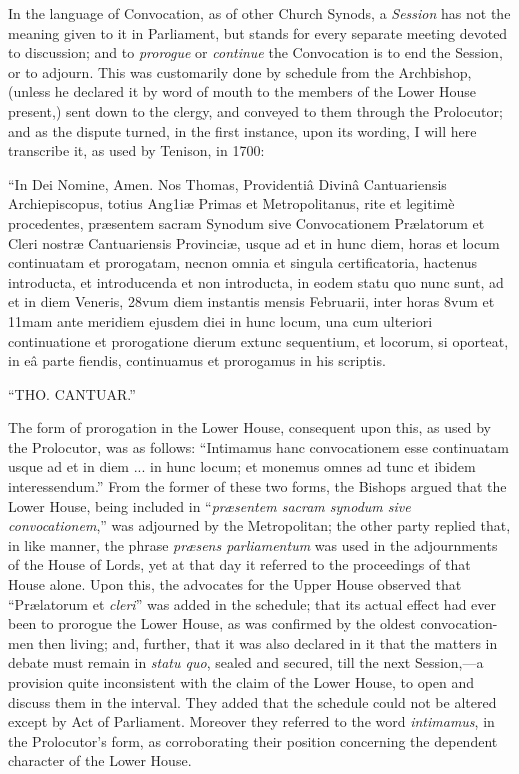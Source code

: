 In the language of
Convocation, as of other Church Synods, a \emph{Session} has not the
meaning given to it in Parliament, but stands for every separate
meeting devoted to discussion; and to \emph{prorogue} or \emph{continue}
the Convocation is to end the Session, or to adjourn. This was
customarily done by schedule from the Archbishop, (unless he declared
it by word of mouth to the members of the Lower House present,) sent
down to the clergy, and conveyed to them through the Prolocutor; and
as the dispute turned, in the first instance, upon its wording, I will
here transcribe it, as used by Tenison, in 1700:

``In Dei Nomine, Amen. Nos Thomas, Providentiâ Divinâ
Cantuariensis Archiepiscopus, totius Ang1iæ Primas et Metropolitanus,
rite et legitimè procedentes, præsentem sacram Synodum sive
Convocationem Prælatorum et Cleri nostræ Cantuariensis Provinciæ,
usque ad et in hunc diem, horas et locum continuatam et prorogatam,
necnon omnia et singula certificatoria, hactenus introducta, et
introducenda et non introducta, in eodem statu quo nunc sunt, ad et in
diem Veneris, 28vum diem instantis mensis Februarii, inter horas 8vum
et 11mam ante meridiem ejusdem diei in hunc locum, una cum ulteriori
continuatione et prorogatione dierum extunc sequentium, et locorum, si
oporteat, in eâ parte fiendis, continuamus et prorogamus in his
scriptis.

``THO. CANTUAR.''

The form of prorogation in the
Lower House, consequent upon this, as used by the Prolocutor, was as
follows: ``Intimamus hanc convocationem esse continuatam usque ad et in
diem ... in hunc locum; et monemus omnes ad tunc et ibidem
interessendum.'' From the former of these two forms, the Bishops argued
that the Lower House, being included in ``\emph{præsentem sacram synodum
sive convocationem},'' was adjourned by the Metropolitan; the other
party replied that, in like manner, the phrase \emph{præsens
parliamentum} was used in the adjournments of the House of Lords,
yet at that day it referred to the proceedings of that House alone.
Upon this, the advocates for the Upper House observed that ``Prælatorum
et \emph{cleri}'' was added in the schedule; that its actual effect had
ever been to prorogue the Lower House, as was confirmed by the oldest
convocation-men then living; and, further, that it was also declared
in it that the matters in debate must remain in \emph{statu quo},
sealed and secured, till the next Session,—a provision quite
inconsistent with the claim of the Lower House, to open and discuss
them in the interval. They added that the schedule could not be
altered except by Act of Parliament. Moreover they referred to the
word \emph{intimamus}, in the Prolocutor's form, as corroborating
their position concerning the dependent character of the Lower House.

